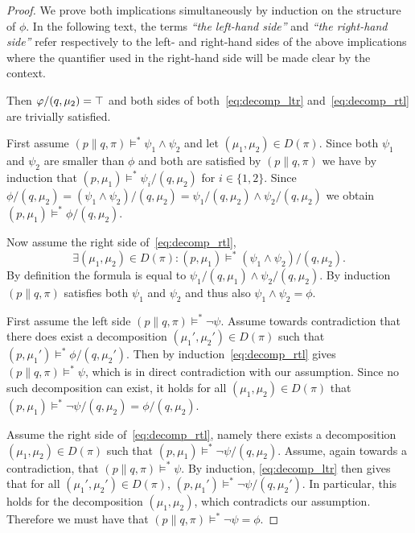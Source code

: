 \begin{proof}
    We prove both implications simultaneously by induction on the structure of $\phi$. 
    In the following text, the terms
    {\em ``the left-hand side''} and {\em ``the right-hand side''} refer respectively
    to the left- and right-hand sides of the above implications where the quantifier
    used in the right-hand side will be made clear by the context.

     Then $\varphi/(q, \mu_2) = \top$ and both sides
    of both~\eqref{eq:decomp_ltr} and~\eqref{eq:decomp_rtl} are trivially satisfied.


    \par\nobreak
    \ltr First assume $(p\parallel q, \pi)
    \vDash^* \psi_1 \land \psi_2$
    and let $(\mu_1,\mu_2)\in D(\pi)$.
    Since both $\psi_1$ and $\psi_2$ are smaller than $\phi$ and both are satisfied by
    $(p\parallel q, \pi)$ we have by induction that $(p,\mu_1) \vDash^* \psi_i/(q, \mu_2)$
    for $i\in\{1,2\}$. Since $\phi/(q,\mu_2) = (\psi_1 \land \psi_2)/(q,\mu_2) =
    \psi_1 / (q, \mu_2) \land \psi_2 / (q,\mu_2)$ we obtain $(p,\mu_1) \vDash^*
    \phi/(q,\mu_2)$.

    \rtl Now assume the right side of~\eqref{eq:decomp_rtl}, 
    \[
        \exists (\mu_1,\mu_2)\in D(\pi) : (p,\mu_1)
        \vDash^* (\psi_1 \land \psi_2)/(q, \mu_2).
    \] 
    By definition the formula is equal
    to $\psi_1/(q,\mu_1) \land \psi_2/(q,\mu_2)$. By induction \mbox{$(p\parallel q, \pi)$}
    satisfies both $\psi_1$ and $\psi_2$ and thus also $\psi_1 \land \psi_2 = \phi$.


    \par\nobreak
    \ltr First assume the left side $(p\parallel q, \pi) \vDash^* \neg\psi$.
    Assume towards
    contradiction that there does exist a decomposition $(\mu_1',\mu_2')\in D(\pi)$
    such that $(p, \mu_1') \vDash^* \phi/(q, \mu_2')$. 
    Then by induction~\eqref{eq:decomp_rtl} gives $(p\parallel q, \pi) \vDash^* \psi$,
    which is in direct contradiction with our assumption. Since no such decomposition
    can exist, it holds for all $(\mu_1,\mu_2)\in D(\pi)$ that
    $(p,\mu_1) \vDash^* \neg\psi/(q,\mu_2) = \phi/(q,\mu_2)$.

    \rtl Assume the right side of~\eqref{eq:decomp_rtl}, namely there exists a
    decomposition $(\mu_1,\mu_2)\in D(\pi)$ such that $(p,\mu_1)\vDash^* \neg\psi/(q,\mu_2)$.
    Assume, again towards a contradiction, that $(p\parallel q,\pi)\vDash^*\psi$.
    By induction, \eqref{eq:decomp_ltr} then gives that for all $(\mu_1',\mu_2')\in D(\pi)$,
    $(p,\mu_1')\vDash^* \neg\psi/(q,\mu_2')$. In particular, this holds for the
    decomposition $(\mu_1,\mu_2)$, which contradicts our assumption. Therefore
    we must have that $(p\parallel q,\pi) \vDash^* \neg\psi = \phi$.



\end{proof}
